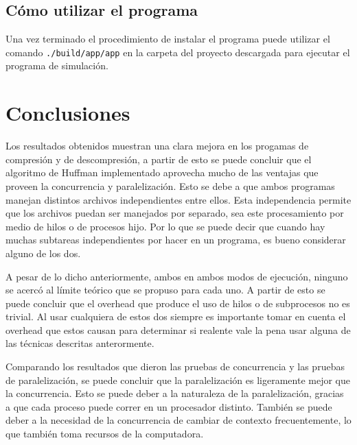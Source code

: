 \documentclass{report}
\begin{document}
\subsection{Cómo utilizar el programa}
Una vez terminado el procedimiento de instalar el programa puede utilizar el comando \texttt{./build/app/app} en la carpeta del proyecto descargada para ejecutar el programa de simulación.





\section{Conclusiones}
Los resultados obtenidos muestran una clara mejora en los progamas de compresión y de descompresión, a partir de esto se puede concluir que el algoritmo de Huffman implementado aprovecha mucho de las ventajas que proveen la concurrencia y paralelización. 
Esto se debe a que ambos programas manejan distintos archivos independientes entre ellos.
Esta independencia permite que los archivos puedan ser manejados por separado, sea este procesamiento por medio de hilos o de procesos hijo.
Por lo que se puede decir que cuando hay muchas subtareas independientes por hacer en un programa, es bueno considerar alguno de los dos. 

A pesar de lo dicho anteriormente, ambos en ambos modos de ejecución, ninguno se acercó al límite teórico que se propuso para cada uno.
A partir de esto se puede concluir que el overhead que produce el uso de hilos o de subprocesos no es trivial.
Al usar cualquiera de estos dos siempre es importante tomar en cuenta el overhead que estos causan para determinar si realente vale la pena usar alguna de las técnicas descritas anterormente.

Comparando los resultados que dieron las pruebas de concurrencia y las pruebas de paralelización, se puede concluir que la paralelización es ligeramente mejor que la concurrencia.
Esto se puede deber a la naturaleza de la paralelización, gracias a que cada proceso puede correr en un procesador distinto. 
También se puede deber a la necesidad de la concurrencia de cambiar de contexto frecuentemente, lo que también toma recursos de la computadora.




%

\end{document}
